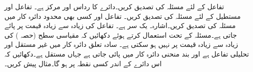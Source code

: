 
\quad
تفاعل  کے لئے مسئلہ  کی تصدیق کریں۔دائرے کا رداس  اور مرکز  ہے۔
\quad
تفاعل  اور مستطیل  کے لئے مسئلہ  کی تصدیق کریں۔
\quad
تفاعل  اور کسی بھی محدود دائرہ کار میں مسئلہ  کی تصدیق کریں۔اشارہ۔  یک سر ہے۔
\quad
تفاعل  کی زیادہ سے زیادہ قیمت  پر پائے جاتی ہے۔مسئلہ  کے تحت استعمال کرتے ہوئے دکھائیں کہ  مقیاسی سطح   (حصہ ) کی زیادہ سے زیادہ قیمت  پر نہیں ہو سکتی ہے۔
\quad
سادہ تعلق دائرہ کار  میں  غیر مستقل اور تحلیلی تفاعل ہے اور بند منحنی  دائرہ کار  میں پائی جاتی ہے جہاں  مستقل ہے۔دکھائیں کہ  اس دائرے کے اندر کسی نقطہ پر ہو گا۔مثال پیش کریں۔
